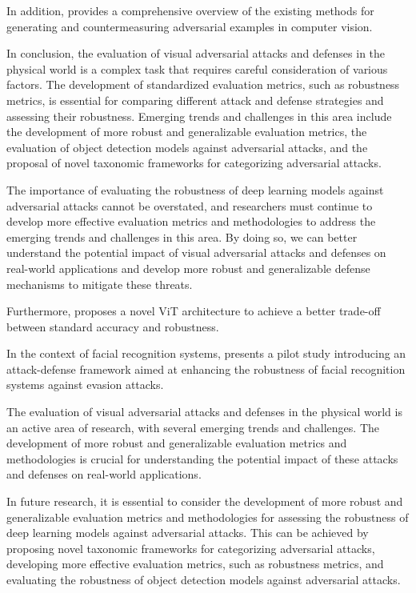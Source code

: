 \documentclass[11pt,a4paper]{article}
\begin{document}
In addition, \cite{doi:10.1007/s10462-024-10841-z} provides a comprehensive overview of the existing methods for generating and countermeasuring adversarial examples in computer vision. 

In conclusion, the evaluation of visual adversarial attacks and defenses in the physical world is a complex task that requires careful consideration of various factors. The development of standardized evaluation metrics, such as robustness metrics, is essential for comparing different attack and defense strategies and assessing their robustness. Emerging trends and challenges in this area include the development of more robust and generalizable evaluation metrics, the evaluation of object detection models against adversarial attacks, and the proposal of novel taxonomic frameworks for categorizing adversarial attacks. 

The importance of evaluating the robustness of deep learning models against adversarial attacks cannot be overstated, and researchers must continue to develop more effective evaluation metrics and methodologies to address the emerging trends and challenges in this area. By doing so, we can better understand the potential impact of visual adversarial attacks and defenses on real-world applications and develop more robust and generalizable defense mechanisms to mitigate these threats. 

Furthermore, \cite{doi:10.1145/3627673.3679750} proposes a novel ViT architecture to achieve a better trade-off between standard accuracy and robustness. 

In the context of facial recognition systems, \cite{doi:10.1109/access.2024.3479949} presents a pilot study introducing an attack-defense framework aimed at enhancing the robustness of facial recognition systems against evasion attacks. 

The evaluation of visual adversarial attacks and defenses in the physical world is an active area of research, with several emerging trends and challenges. The development of more robust and generalizable evaluation metrics and methodologies is crucial for understanding the potential impact of these attacks and defenses on real-world applications. 

In future research, it is essential to consider the development of more robust and generalizable evaluation metrics and methodologies for assessing the robustness of deep learning models against adversarial attacks. This can be achieved by proposing novel taxonomic frameworks for categorizing adversarial attacks, developing more effective evaluation metrics, such as robustness metrics, and evaluating the robustness of object detection models against adversarial attacks. 
\end{document}
